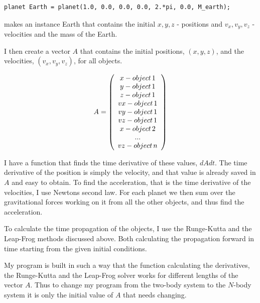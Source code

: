 \documentclass[a4paper,12pt, english]{article}
\begin{document}
\begin{lstlisting}[title={Making of instance}]
planet Earth = planet(1.0, 0.0, 0.0, 0.0, 2.*pi, 0.0, M_earth);
\end{lstlisting}

makes an instance Earth that contains the initial $x, y, z$ - positions and $v_x, v_y, v_z$ - velocities and the mass of the Earth.

I then create a vector $A$ that contains the initial positions, $(x,y,z)$, and the velocities, $(v_x,v_y,v_z)$, for all objects.

\[ A = \left( \begin{array}{c}
x - object \hspace*{0.5mm} 1\\
y - object \hspace*{0.5mm} 1\\
z - object \hspace*{0.5mm} 1 \\
vx - object \hspace*{0.5mm} 1\\
vy -object \hspace*{0.5mm} 1\\
vz - object \hspace*{0.5mm} 1 \\
x - object \hspace*{0.5mm} 2\\
... \\
vz - object \hspace*{0.5mm} n \end{array} \right)\]

I have a function that finds the time derivative of these values, $dAdt$. The time derivative of the position is simply the velocity, and that value is already saved in $A$ and easy to obtain. To find the acceleration, that is the time derivative of the velocities, I use Newtons second law. For each planet we then sum over the gravitational forces working on it from all the other objects, and thus find the acceleration.

To calculate the time propagation of the objects, I use the Runge-Kutta and the Leap-Frog methods discussed above. Both calculating the propagation forward in time starting from the given initial conditions.

My program is built in such a way that the function calculating the derivatives, the Runge-Kutta and the Leap-Frog solver works for different lengths of the vector $A$. Thus to change my program from the two-body system to the $N$-body system it is only the initial value of $A$ that needs changing.
\end{document}
